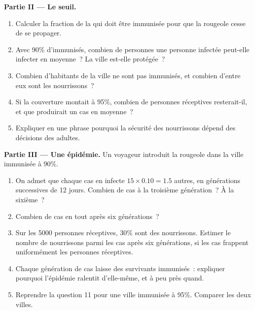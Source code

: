 \begin{problem}
\medskip
\noindent\textbf{Partie II --- Le seuil.}
\begin{enumerate}[resume]
  \item Calculer la fraction de la  qui doit être immunisée
        pour que la rougeole cesse de se propager.
  \item Avec 90\% d'immunisés, combien de personnes une personne
        infectée peut-elle infecter en moyenne~? La ville est-elle
        protégée~?
  \item Combien d'habitants de la ville ne sont pas immunisés, et
        combien d'entre eux sont les nourrissons~?
  \item Si la couverture montait à 95\%, combien de personnes
        réceptives resterait-il, et que produirait un cas en moyenne~?
  \item Expliquer en une phrase pourquoi la sécurité des nourrissons
        dépend des décisions des adultes.
\end{enumerate}

\medskip
\noindent\textbf{Partie III --- Une épidémie.}
Un voyageur introduit la rougeole dans la ville immunisée à 90\%.
\begin{enumerate}[resume]
  \item On admet que chaque cas en infecte $15 \times 0.10 = 1.5$
        autres, en générations successives de 12 jours. Combien de cas
        à la troisième génération~? À la sixième~?
  \item Combien de cas en tout après six générations~?
  \item Sur les 5000 personnes réceptives, 30\% sont des nourrissons.
        Estimer le nombre de nourrissons parmi les cas après six
        générations, si les cas frappent uniformément les personnes
        réceptives.
  \item Chaque génération de cas laisse des survivants immunisés~:
        expliquer pourquoi l'épidémie ralentit d'elle-même, et à peu
        près quand.
  \item Reprendre la question 11 pour une ville immunisée à 95\%.
        Comparer les deux villes.
\end{enumerate}


\end{problem}
